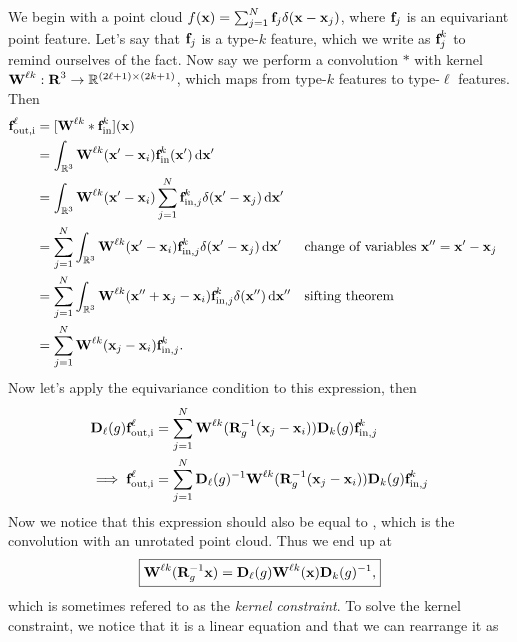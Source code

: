 We begin with a point cloud $f(\textbf{x}) = \sum_{j=1}^N\textbf{f}_j \delta(\textbf{x} - \textbf{x}_j)$, where $\textbf{f}_j$ is an equivariant point feature. Let's say that $\textbf{f}_j$ is a type-$k$ feature, which we write as $\textbf{f}_j^k$ to remind ourselves of the fact. Now say we perform a convolution $*$ with kernel $\textbf{W}^{\ell k}: \textbf{R}^3 \to \mathbb{R}^{(2\ell+1)\times(2k +1)}$, which maps from type-$k$ features to type-$\ell$ features. Then
\begin{align}
    \textbf{f}_\text{out,i}^\ell &= [\textbf{W}^{\ell k} * \textbf{f}_{\text{in}}^k](\textbf{x}) \\
    &= \int_{\mathbb{R}^3} \textbf{W}^{\ell k}(\textbf{x}' - \textbf{x}_i)\textbf{f}_{\text{in}}^k(\textbf{x}') \, \mathrm{d} \textbf{x}' \\
    &= \int_{\mathbb{R}^3} \textbf{W}^{\ell k}(\textbf{x}' - \textbf{x}_i) \sum_{j=1}^N \textbf{f}_{\text{in},j}^k\delta(\textbf{x}' - \textbf{x}_j) \, \mathrm{d} \textbf{x}' \\
    &= \sum_{j=1}^N \int_{\mathbb{R}^3} \textbf{W}^{\ell k}(\textbf{x}' - \textbf{x}_i)  \textbf{f}_{\text{in},j}^k\delta(\textbf{x}' - \textbf{x}_j) \, \mathrm{d} \textbf{x}' && \text{change of variables } \textbf{x}'' = \textbf{x}' - \textbf{x}_j \\
    &= \sum_{j=1}^N \int_{\mathbb{R}^3} \textbf{W}^{\ell k}(\textbf{x}'' + \textbf{x}_j - \textbf{x}_i)  \textbf{f}_{\text{in},j}^k\delta(\textbf{x}'') \, \mathrm{d} \textbf{x}'' && \text{sifting theorem }\\
    &= \sum_{j=1}^N \textbf{W}^{\ell k}(\textbf{x}_j - \textbf{x}_i)  \textbf{f}_{\text{in},j}^k. \label{eq:tfn-conv}
\end{align}
Now let's apply the equivariance condition to this expression, then
\begin{align}
    \textbf{D}_\ell(g) \textbf{f}_\text{out,i}^\ell &= \sum_{j=1}^N \textbf{W}^{\ell k}(\textbf{R}_g^{-1}(\textbf{x}_j - \textbf{x}_i)) \textbf{D}_k(g) \textbf{f}_{\text{in},j}^k \\
    \implies \textbf{f}_\text{out,i}^\ell &= \sum_{j=1}^N \textbf{D}_\ell(g)^{-1} \textbf{W}^{\ell k}(\textbf{R}_g^{-1}(\textbf{x}_j - \textbf{x}_i)) \textbf{D}_k(g) \textbf{f}_{\text{in},j}^k 
\end{align}
Now we notice that this expression should also be equal to , which is the convolution with an unrotated point cloud. Thus we end up at
\begin{align}
\boxed{
    \textbf{W}^{\ell k}(\textbf{R}_g^{-1}\textbf{x}) = \textbf{D}_\ell(g) \textbf{W}^{\ell k}(\textbf{x}) \textbf{D}_k(g)^{-1},
}
\end{align}
which is sometimes refered to as the \emph{kernel constraint}. To solve the kernel constraint, we notice that it is a linear equation and that we can rearrange it as
